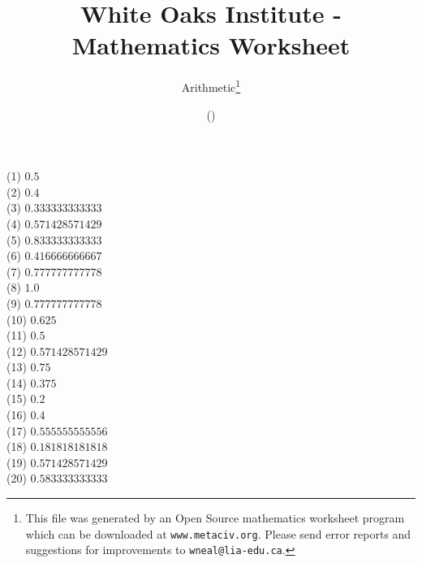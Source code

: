 \documentclass[letter]{article}
\begin{document}
\title{White Oaks Institute - Mathematics Worksheet}
\author{Arithmetic\thanks{This file was generated by an \textsf{Open Source} mathematics worksheet program which can be downloaded at \texttt{www.metaciv.org}. Please send error reports and suggestions for improvements to \texttt{wneal@lia-edu.ca}.}}
\date{\XCfileversion{} (\XCfiledate)}
\maketitle
\setlength{\parskip}{12mm plus 4mm minus 4mm}\setlength{\parindent}{0cm}\begin{multicols}{2}(1) $0.5$\\(2) $0.4$\\(3) $0.333333333333$\\(4) $0.571428571429$\\(5) $0.833333333333$\\(6) $0.416666666667$\\(7) $0.777777777778$\\(8) $1.0$\\(9) $0.777777777778$\\(10) $0.625$\\(11) $0.5$\\(12) $0.571428571429$\\(13) $0.75$\\(14) $0.375$\\(15) $0.2$\\(16) $0.4$\\(17) $0.555555555556$\\(18) $0.181818181818$\\(19) $0.571428571429$\\(20) $0.583333333333$\\\end{multicols}
\end{document}
